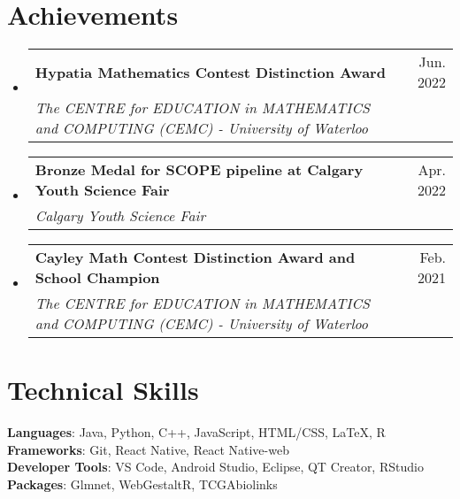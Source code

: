 \documentclass[letterpaper,11pt]{article}
\makeatletter
\newcommand{\resumeSubheading}[4]{
  \vspace{-2pt}\item
    \begin{tabular*}{0.97\textwidth}[t]{l@{\extracolsep{\fill}}r}
      \textbf{#1} & #2 \\
      \textit{\small#3} & \textit{\small #4} \\
    \end{tabular*}\vspace{-7pt}
}
\newcommand{\resumeSubHeadingListStart}{\begin{itemize}[leftmargin=0.15in, label={}]}
\newcommand{\resumeSubHeadingListEnd}{\end{itemize}}
\makeatother
\begin{document}

\section{Achievements}
    \resumeSubHeadingListStart
        \resumeSubheading
            {Hypatia Mathematics Contest Distinction Award}{Jun. 2022}
            {The CENTRE for EDUCATION in MATHEMATICS and COMPUTING (CEMC) - University of Waterloo}{}
        \resumeSubheading
            {Bronze Medal for SCOPE pipeline at Calgary Youth Science Fair}{Apr. 2022}
            {Calgary Youth Science Fair}{}
        \resumeSubheading
            {Cayley Math Contest Distinction Award and School Champion}{Feb. 2021}
            {The CENTRE for EDUCATION in MATHEMATICS and COMPUTING (CEMC) - University of Waterloo}{}     
    \resumeSubHeadingListEnd     
            

\section{Technical Skills}
 \begin{itemize}[leftmargin=0.15in, label={}]
    \small{\item{
     \textbf{Languages}{: Java, Python, C++, JavaScript, HTML/CSS, LaTeX, R} \\
     \textbf{Frameworks}{: Git, React Native, React Native-web} \\
     \textbf{Developer Tools}{: VS Code, Android Studio, Eclipse, QT Creator, RStudio} \\
     \textbf{Packages}{: Glmnet, WebGestaltR, TCGAbiolinks}
    }}
 \end{itemize}


\end{document}
